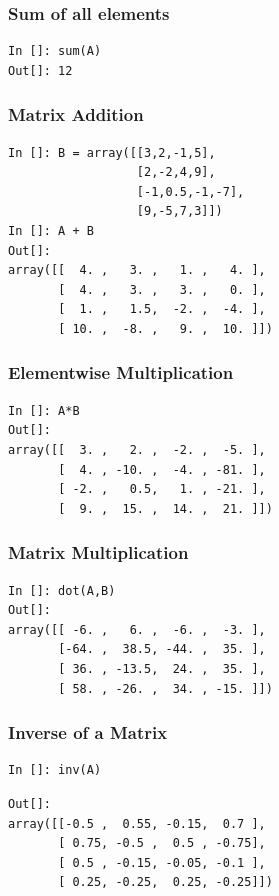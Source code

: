 \documentclass[14pt,compress]{beamer}
\begin{document}
\begin{frame}[fragile]
  \frametitle{Sum of all elements}
  \begin{lstlisting}
In []: sum(A)
Out[]: 12
  \end{lstlisting}
\end{frame}

\begin{frame}[fragile]
  \frametitle{Matrix Addition}
  \begin{lstlisting}
In []: B = array([[3,2,-1,5],
                  [2,-2,4,9],
                  [-1,0.5,-1,-7],
                  [9,-5,7,3]])
In []: A + B
Out[]: 
array([[  4. ,   3. ,   1. ,   4. ],
       [  4. ,   3. ,   3. ,   0. ],
       [  1. ,   1.5,  -2. ,  -4. ],
       [ 10. ,  -8. ,   9. ,  10. ]])
  \end{lstlisting}
\end{frame}

\begin{frame}[fragile]
\frametitle{Elementwise Multiplication}
\begin{lstlisting}
In []: A*B
Out[]: 
array([[  3. ,   2. ,  -2. ,  -5. ],
       [  4. , -10. ,  -4. , -81. ],
       [ -2. ,   0.5,   1. , -21. ],
       [  9. ,  15. ,  14. ,  21. ]])

\end{lstlisting}
\end{frame}

\begin{frame}[fragile]
\frametitle{Matrix Multiplication}
\begin{lstlisting}
In []: dot(A,B)
Out[]: 
array([[ -6. ,   6. ,  -6. ,  -3. ],
       [-64. ,  38.5, -44. ,  35. ],
       [ 36. , -13.5,  24. ,  35. ],
       [ 58. , -26. ,  34. , -15. ]])
\end{lstlisting}
\end{frame}

\begin{frame}[fragile]
\frametitle{Inverse of a Matrix}
\begin{lstlisting}
In []: inv(A)
\end{lstlisting}
\begin{small}
\begin{lstlisting}
Out[]: 
array([[-0.5 ,  0.55, -0.15,  0.7 ],
       [ 0.75, -0.5 ,  0.5 , -0.75],
       [ 0.5 , -0.15, -0.05, -0.1 ],
       [ 0.25, -0.25,  0.25, -0.25]])
\end{lstlisting}
\end{small}
\end{frame}
\end{document}

